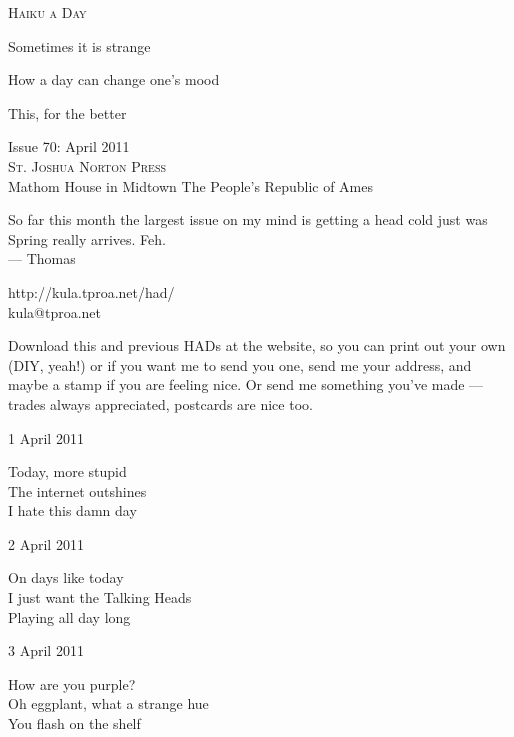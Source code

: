 \documentclass[12pt]{article}
\begin{document}
\begin{center}
{\fontsize{36}{48}\selectfont \textsc{Haiku a Day }}
\end{center}

\vspace*{3.5cm}

{\fontsize{20}{40}\selectfont 


Sometimes it is strange

How a day can change one's mood

This, for the better


}

\vspace*{5.0cm}
\begin{center}
{\large{Issue 70: April 2011}} \\[5mm]
{\fontsize{8}{8}\selectfont  \textsc{ St. Joshua Norton Press }} \\[1mm]
{\fontsize{6}{6}\selectfont Mathom House in Midtown \textbar The People's Republic of Ames }
\end{center}


\newpage

So far this month the largest issue on my mind is getting a
head cold just was Spring really arrives. Feh. \\
--- Thomas

http://kula.tproa.net/had/ \\
kula@tproa.net

Download this and previous HADs at the website, so you can
print out your own (DIY, yeah!) or if you want me to send
you one, send me your address, and maybe a stamp if you
are feeling nice. Or send me something you've made ---
trades always appreciated, postcards are nice too.

\vfill

1 April 2011

Today, more stupid \\
The internet outshines \\
I hate this damn day

2 April 2011

On days like today \\
I just want the Talking Heads \\
Playing all day long

\newpage


3 April 2011

How are you purple? \\
Oh eggplant, what a strange hue \\
You flash on the shelf
\end{document}
